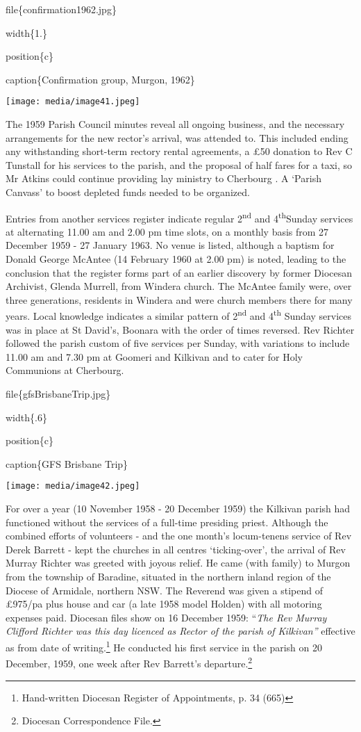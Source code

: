 file\{confirmation1962.jpg\}

width\{1.\}

position\{c\}

caption\{Confirmation group, Murgon, 1962\}

\texttt{[image: media/image41.jpeg]}

The 1959 Parish Council minutes reveal all ongoing business, and the necessary arrangements for the new rector's arrival, was attended to. This included ending any withstanding short-term rectory rental agreements, a £50 donation to Rev C Tunstall for his services to the parish, and the proposal of half fares for a taxi, so Mr Atkins could continue providing lay ministry to Cherbourg . A `Parish Canvass' to boost depleted funds needed to be organized.

Entries from another services register indicate regular 2\textsuperscript{nd} and 4\textsuperscript{th}Sunday services at alternating 11.00 am and 2.00 pm time slots, on a monthly basis from 27 December 1959 - 27 January 1963. No venue is listed, although a baptism for Donald George McAntee (14 February 1960 at 2.00 pm) is noted, leading to the conclusion that the register forms part of an earlier discovery by former Diocesan Archivist, Glenda Murrell, from Windera church. The McAntee family were, over three generations, residents in Windera and were church members there for many years. Local knowledge indicates a similar pattern of 2\textsuperscript{nd} and 4\textsuperscript{th} Sunday services was in place at St David's, Boonara with the order of times reversed. Rev Richter followed the parish custom of five services per Sunday, with variations to include 11.00 am and 7.30 pm at Goomeri and Kilkivan and to cater for Holy Communions at Cherbourg.

file\{gfsBrisbaneTrip.jpg\}

width\{.6\}

position\{c\}

caption\{GFS Brisbane Trip\}

\texttt{[image: media/image42.jpeg]}

For over a year (10 November 1958 - 20 December 1959) the Kilkivan parish had functioned without the services of a full-time presiding priest. Although the combined efforts of volunteers - and the one month's locum-tenens service of Rev Derek Barrett - kept the churches in all centres `ticking-over', the arrival of Rev Murray Richter was greeted with joyous relief. He came (with family) to Murgon from the township of Baradine, situated in the northern inland region of the Diocese of Armidale, northern NSW. The Reverend was given a stipend of £975/pa plus house and car (a late 1958 model Holden) with all motoring expenses paid. Diocesan files show on 16 December 1959: ``\emph{The Rev Murray Clifford Richter was this day licenced as Rector of the parish of Kilkivan''} effective as from date of writing.\footnote{Hand-written Diocesan Register of Appointments, p. 34 (665)} He conducted his first service in the parish on 20 December, 1959, one week after Rev Barrett's departure.\footnote{Diocesan Correspondence File.}

